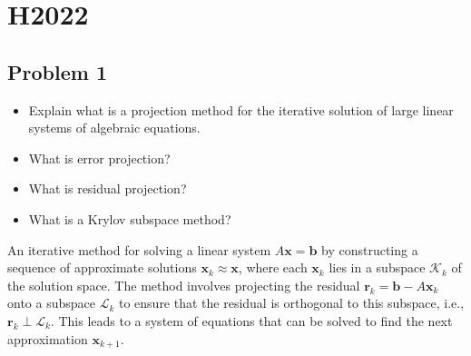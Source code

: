 \section{H2022}

\subsection{Problem 1}
\begin{itemize}
    \item Explain what is a projection method for the iterative solution of large linear systems of algebraic equations.
    \item What is error projection?
    \item What is residual projection?
    \item What is a Krylov subspace method?
\end{itemize}

An iterative method for solving a linear system $A\mathbf{x} = \mathbf{b}$ by constructing a sequence of approximate solutions $\mathbf{x}_k \approx \mathbf{x}$, where each $\mathbf{x}_k$ lies in a subspace $\mathcal{K}_k$ of the solution space. The method involves projecting the residual $\mathbf{r}_k = \mathbf{b} - A\mathbf{x}_k$ onto a subspace $\mathcal{L}_k$ to ensure that the residual is orthogonal to this subspace, i.e., $\mathbf{r}_k \perp \mathcal{L}_k$. This leads to a system of equations that can be solved to find the next approximation $\mathbf{x}_{k+1}$.
